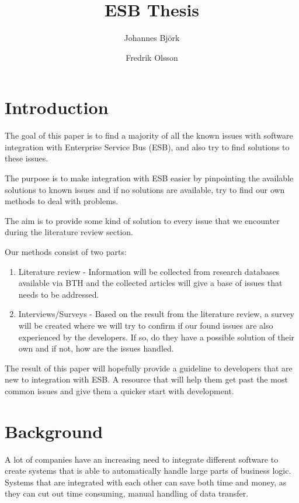 \documentclass{llncs}
\title{ESB Thesis}
\author{Johannes Björk \inst{1} \and Fredrik Olsson \inst{1}}
\institute{
	Blekinge Institute of Technology \\
	\email{spooky.bender@gmail.com}, \email{toppsen@gmail.com}
}
\begin{document}
\maketitle

\begin{abstract}

\end{abstract}

\section{Introduction}
The goal of this paper is to find a majority of all the known issues with software integration with Enterprise Service Bus (ESB), and also try to find solutions to these issues.

The purpose is to make integration with ESB easier by pinpointing the available solutions to known issues and if no solutions are available, try to find our own methods to deal with problems.

The aim is to provide some kind of solution to every issue that we encounter during the literature review section.

Our methods consist of two parts:
\begin{enumerate}
 \item Literature review - Information will be collected from research databases available via BTH and the collected articles will give a base of issues that needs to be addressed.
 \item Interviews/Surveys - Based on the result from the literature review, a survey will be created where we will try to confirm if our found issues are also experienced by the developers. If so, do they have a possible solution of their own and if not, how are the issues handled.
\end{enumerate}
The result of this paper will hopefully provide a guideline to developers that are new to integration with ESB. A resource that will help them get past the most common issues and give them a quicker start with development.

\section{Background}
A lot of companies have an increasing need to integrate different software to create systems that is able to automatically handle large parts of business logic. Systems that are integrated with each other can save both time and money, as they can cut out time consuming, manual handling of data transfer.
\end{document}

